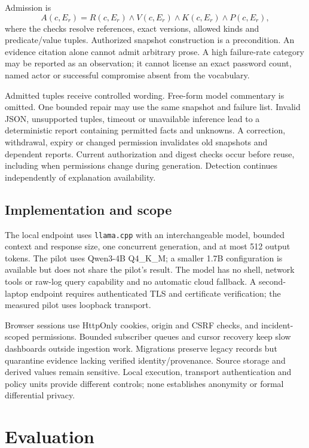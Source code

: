 \documentclass[conference,letterpaper]{IEEEtran}
\begin{document}
Admission is
\begin{equation}
A(c,E_r)=R(c,E_r)\land V(c,E_r)\land K(c,E_r)\land P(c,E_r),
\label{eq:admit}
\end{equation}
where the checks resolve references, exact versions, allowed kinds and predicate/value tuples. Authorized snapshot construction is a precondition. An evidence citation alone cannot admit arbitrary prose. A high failure-rate category may be reported as an observation; it cannot license an exact password count, named actor or successful compromise absent from the vocabulary.

Admitted tuples receive controlled wording. Free-form model commentary is omitted. One bounded repair may use the same snapshot and failure list. Invalid JSON, unsupported tuples, timeout or unavailable inference lead to a deterministic report containing permitted facts and unknowns. A correction, withdrawal, expiry or changed permission invalidates old snapshots and dependent reports. Current authorization and digest checks occur before reuse, including when permissions change during generation. Detection continues independently of explanation availability.

\subsection{Implementation and scope}
The local endpoint uses \texttt{llama.cpp} with an interchangeable model, bounded context and response size, one concurrent generation, and at most 512 output tokens. The pilot uses Qwen3-4B Q4\_K\_M; a smaller 1.7B configuration is available but does not share the pilot's result. The model has no shell, network tools or raw-log query capability and no automatic cloud fallback. A second-laptop endpoint requires authenticated TLS and certificate verification; the measured pilot uses loopback transport.

Browser sessions use HttpOnly cookies, origin and CSRF checks, and incident-scoped permissions. Bounded subscriber queues and cursor recovery keep slow dashboards outside ingestion work. Migrations preserve legacy records but quarantine evidence lacking verified identity/provenance. Source storage and derived values remain sensitive. Local execution, transport authentication and policy units provide different controls; none establishes anonymity or formal differential privacy.



\section{Evaluation}
\end{document}
